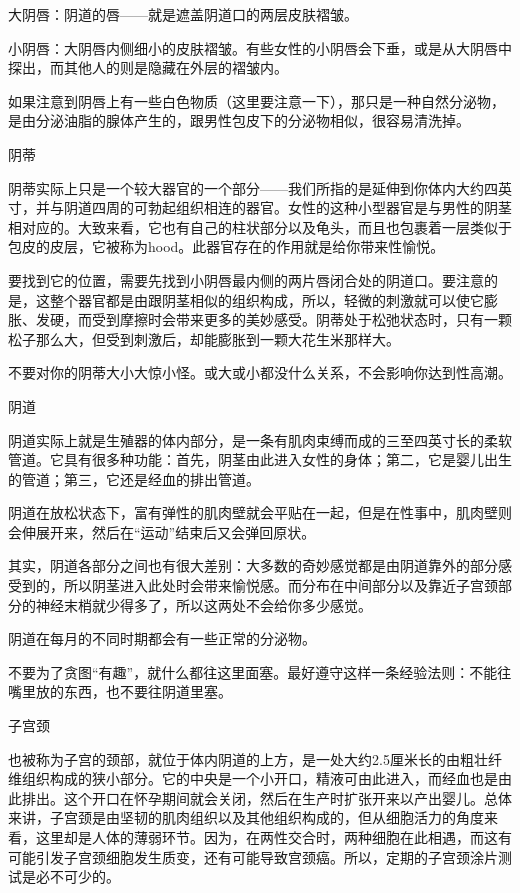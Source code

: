 \documentclass[12pt,UTF8,openany]{ctexbook}
\begin{document}
大阴唇：阴道的唇——就是遮盖阴道口的两层皮肤褶皱。

小阴唇：大阴唇内侧细小的皮肤褶皱。有些女性的小阴唇会下垂，或是从大阴唇中探出，而其他人的则是隐藏在外层的褶皱内。

如果注意到阴唇上有一些白色物质（这里要注意一下），那只是一种自然分泌物，是由分泌油脂的腺体产生的，跟男性包皮下的分泌物相似，很容易清洗掉。

阴蒂

阴蒂实际上只是一个较大器官的一个部分——我们所指的是延伸到你体内大约四英寸，并与阴道四周的可勃起组织相连的器官。女性的这种小型器官是与男性的阴茎相对应的。大致来看，它也有自己的柱状部分以及龟头，而且也包裹着一层类似于包皮的皮层，它被称为hood。此器官存在的作用就是给你带来性愉悦。

要找到它的位置，需要先找到小阴唇最内侧的两片唇闭合处的阴道口。要注意的是，这整个器官都是由跟阴茎相似的组织构成，所以，轻微的刺激就可以使它膨胀、发硬，而受到摩擦时会带来更多的美妙感受。阴蒂处于松弛状态时，只有一颗松子那么大，但受到刺激后，却能膨胀到一颗大花生米那样大。

不要对你的阴蒂大小大惊小怪。或大或小都没什么关系，不会影响你达到性高潮。

阴道

阴道实际上就是生殖器的体内部分，是一条有肌肉束缚而成的三至四英寸长的柔软管道。它具有很多种功能：首先，阴茎由此进入女性的身体；第二，它是婴儿出生的管道；第三，它还是经血的排出管道。

阴道在放松状态下，富有弹性的肌肉壁就会平贴在一起，但是在性事中，肌肉壁则会伸展开来，然后在“运动”结束后又会弹回原状。

其实，阴道各部分之间也有很大差别：大多数的奇妙感觉都是由阴道靠外的部分感受到的，所以阴茎进入此处时会带来愉悦感。而分布在中间部分以及靠近子宫颈部分的神经末梢就少得多了，所以这两处不会给你多少感觉。

阴道在每月的不同时期都会有一些正常的分泌物。

不要为了贪图“有趣”，就什么都往这里面塞。最好遵守这样一条经验法则：不能往嘴里放的东西，也不要往阴道里塞。

子宫颈

也被称为子宫的颈部，就位于体内阴道的上方，是一处大约2.5厘米长的由粗壮纤维组织构成的狭小部分。它的中央是一个小开口，精液可由此进入，而经血也是由此排出。这个开口在怀孕期间就会关闭，然后在生产时扩张开来以产出婴儿。总体来讲，子宫颈是由坚韧的肌肉组织以及其他组织构成的，但从细胞活力的角度来看，这里却是人体的薄弱环节。因为，在两性交合时，两种细胞在此相遇，而这有可能引发子宫颈细胞发生质变，还有可能导致宫颈癌。所以，定期的子宫颈涂片测试是必不可少的。
\end{document}
